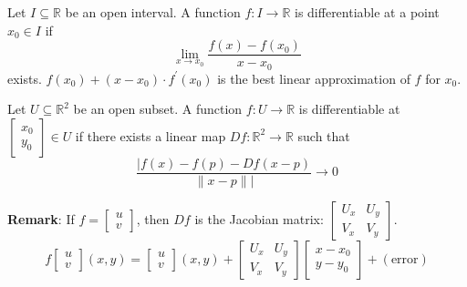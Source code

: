 \documentclass{report}
\begin{document}
\begin{definition}{}
    Let $I \subseteq \mathbb{R}$ be an open interval. A function $f : I \rightarrow \mathbb{R}$ is differentiable at a point $x_{0} \in I$ if 
        \begin{equation*}
            \lim\limits_{x \to x_{0}}\dfrac{f(x) - f(x_{0})}{x - x_{0}}
        \end{equation*}
    exists. $f(x_{0}) + (x - x_{0}) \cdot f^{\prime}(x_{0})$ is the best linear approximation of $f$ for $x_{0}$.
\end{definition}

\begin{definition}{}
    Let $U \subseteq \mathbb{R}^{2}$ be an open subset. A function $f : U \rightarrow \mathbb{R}$ is differentiable at $\begin{bmatrix}
        x_{0} \\
        y_{0}   
    \end{bmatrix} \in U$ if there exists a linear map $Df : \mathbb{R}^{2} \rightarrow \mathbb{R}$ such that 
        \begin{equation*}
            \dfrac{\lvert f(x) - f(p) - Df(x - p)}{\lVert x - p \rVert \rvert} \rightarrow 0
        \end{equation*}
\end{definition}

\textbf{Remark}: If $f = \begin{bmatrix}
    u \\
    v   
\end{bmatrix}$, then $Df$ is the Jacobian matrix: $\begin{bmatrix}
    U_{x} & U_{y} \\
    V_{x} & V_{y}   
\end{bmatrix}$. 
    \begin{equation*}
        f \begin{bmatrix}
            u \\
            v   
        \end{bmatrix}(x, y) = \begin{bmatrix}
            u \\
            v   
        \end{bmatrix}(x, y) + \begin{bmatrix}
            U_{x} & U_{y} \\
            V_{x} & V_{y}   
        \end{bmatrix} \begin{bmatrix}
            x - x_{0} \\
            y - y_{0}   
        \end{bmatrix} + (\text{error})
    \end{equation*}
\end{document}
